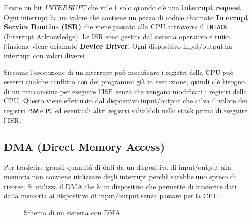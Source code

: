 \documentclass[a4paper]{article}
\theoremstyle{break}
\theoremstyle{break}
\theoremstyle{break}
\theoremstyle{break}
\begin{document}
\noindent Esiste un bit \( \overline{INTERRUPT} \) che
vale 1 solo quando c'è una \textbf{interrupt request}. Ogni interrupt ha un valore
che contiene un pezzo di codice chiamato \textbf{Interrupt Service Routine (ISR)}
che viene passato alla CPU attraverso il \texttt{INTACK} (Interrupt Acknowledge).
Le ISR sono gestite dal sistema operativo e tutto l'insieme viene chiamato \textbf{Device Driver}.
Ogni dispositivo input/output ha interrupt con valori diversi.

\vspace{1em}
\noindent Siccome l'esecuzione di un interrupt può modificare i registri della CPU può esserci
qualche conflitto con dei programmi già in esecuzione, quindi c'è bisogno di un meccanismo
per eseguire l'ISR senza che vengano modificati i registri della CPU. Questo viene
effettuato dal dispositivo input/output che salva il valore dei registri \texttt{PSW} e
\texttt{PC} ed eventuali altri registri salvaldoli nello stack prima di eseguire l'ISR.

\subsection{DMA (Direct Memory Access)}
Per trasferire grandi quantità di dati da un dispositivo di input/output alla memoria
non conviene utilizzare degli interrupt perchè sarebbe uno spreco di risorse. Si utilizza
il DMA che è un dispositivo che permette di trasferire dati dalla memoria al dispositivo
di input/output senza passare per la CPU.


\begin{figure}[H]
	\centering
	\caption{Schema di un sistema con DMA}
\end{figure}
\end{document}
